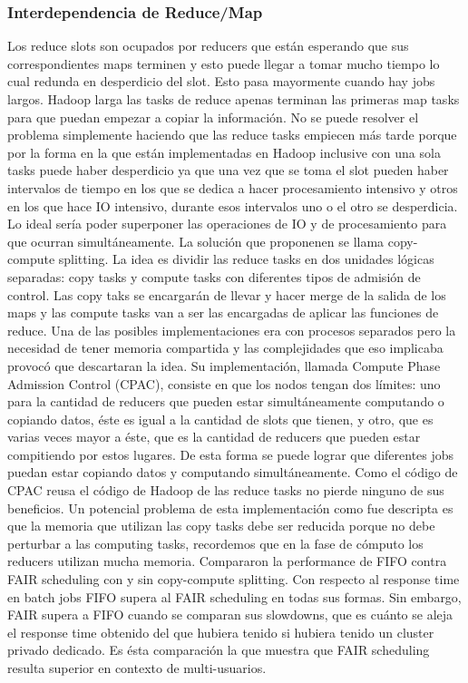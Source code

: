 \subsubsection{Interdependencia de Reduce/Map}
Los reduce slots son ocupados por reducers que están esperando que 
sus correspondientes maps terminen y esto puede llegar a tomar mucho tiempo lo cual
redunda en desperdicio del slot. Esto pasa mayormente cuando hay jobs largos. Hadoop
larga las tasks de reduce apenas terminan las primeras map tasks para que puedan empezar a copiar
la información. No se puede resolver el problema simplemente haciendo que las reduce tasks empiecen
más tarde porque por la forma en la que están implementadas en Hadoop inclusive con una sola tasks
puede haber desperdicio ya que una vez que se toma el slot pueden haber intervalos de tiempo 
en los que se dedica a hacer procesamiento intensivo y otros en los que hace IO intensivo, durante
esos intervalos uno o el otro se desperdicia. Lo ideal sería poder superponer las operaciones de IO 
y de procesamiento para que ocurran simultáneamente.
La solución que proponenen se llama copy-compute splitting. La idea es dividir las reduce tasks en dos unidades 
lógicas separadas: copy tasks y compute tasks con diferentes tipos de admisión de control. Las
copy taks se encargarán de llevar y hacer merge de la salida de los maps y las compute tasks
van a ser las encargadas de aplicar las funciones de reduce. Una de las posibles implementaciones
era con procesos separados pero la necesidad de tener memoria compartida y las complejidades 
que eso implicaba provocó que descartaran la idea. Su implementación, llamada Compute Phase
Admission Control (CPAC), consiste en que los nodos tengan dos límites: uno para la cantidad
de reducers que pueden estar simultáneamente computando o copiando datos, éste es igual a 
la cantidad de slots que tienen, y otro, que es varias veces mayor a éste, que es la cantidad
de reducers que pueden estar compitiendo por estos lugares. De esta forma se puede lograr 
que diferentes jobs puedan estar copiando datos y computando simultáneamente. Como el código de
CPAC reusa el código de Hadoop de las reduce tasks no pierde ninguno de sus beneficios.
Un potencial problema de esta implementación como fue descripta es que la memoria que 
utilizan las copy tasks debe ser reducida porque no debe perturbar a las computing tasks,
recordemos que en la fase de cómputo los reducers utilizan mucha memoria.
Compararon la performance de FIFO contra FAIR scheduling con y sin copy-compute splitting.
Con respecto al response time en batch jobs FIFO supera al FAIR scheduling en todas sus formas.
Sin embargo, FAIR supera a FIFO cuando se comparan sus slowdowns, que es cuánto se aleja 
el response time obtenido del que hubiera tenido si hubiera tenido un cluster privado dedicado.
Es ésta comparación la que muestra que FAIR scheduling resulta superior en contexto de multi-usuarios.

